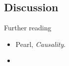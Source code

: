 \subsection{Discussion}
\begin{frame}
  \begin{block}{Further reading}
    \begin{itemize}
    \item Pearl, \emph{Causality}.
    \item \citet{dawid2012decision}
    \end{itemize}
  \end{block}
\end{frame}
